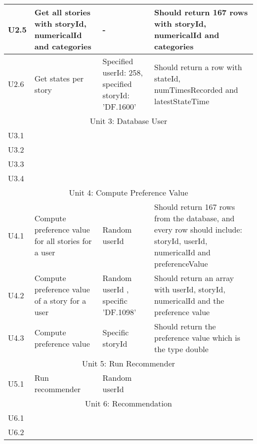 {\begin{longtable}{ | p{1.5cm} | p{6.5cm} | p{3cm} | p{6.5cm} |}
			U2.5 & Get all stories with storyId, numericalId and categories & - & Should return 167 rows with storyId, numericalId and categories  \\ \hline
			
			U2.6 & Get states per story  & Specified userId: 258, specified storyId: 'DF.1600'& Should return a row with stateId, numTimesRecorded and latestStateTime  \\ \hline
			
			\multicolumn{4}{c}{Unit 3: Database User}	\\\hline
						
			U3.1 &  & &   \\ \hline
			
			U3.2 &  & &  \\ \hline
			
			U3.3 &  & &   \\ \hline
			
			U3.4 &  & &   \\ \hline
			
			\multicolumn{4}{c}{Unit 4: Compute Preference Value}	\\\hline
			
			U4.1 & Compute preference value for all stories for a  user & Random userId & Should return 167 rows from the database, and every row should include: storyId, userId, numericalId and preferenceValue   \\ \hline
			
			U4.2 & Compute preference value of a story for a user  & Random userId , specific 'DF.1098' & Should return an array with userId, storyId, numericalId and the preference value \\ \hline
			
			U4.3 & Compute preference value & Specific storyId  & Should return the preference value which is the type double \\ \hline
			
			\multicolumn{4}{c}{Unit 5: Run Recommender}	\\\hline
			
			U5.1 & Run recommender & Random userId  &  \\ \hline			
			
			\multicolumn{4}{c}{Unit 6: Recommendation}	\\\hline 
			

			
			U6.1 &  & &  \\ \hline			
			
			U6.2 &  & &  \\ \hline	
			

\end{longtable}}
